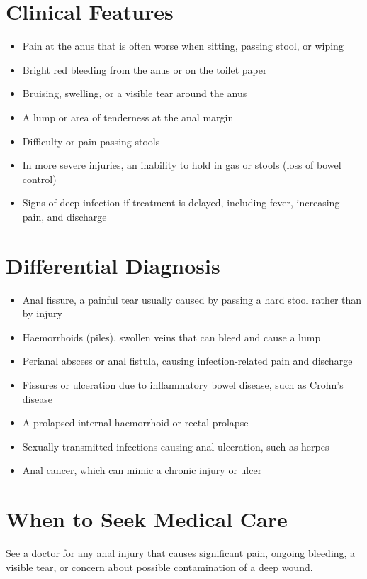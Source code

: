 \section*{Clinical Features}
\begin{itemize}
    \item Pain at the anus that is often worse when sitting, passing stool, or wiping
    \item Bright red bleeding from the anus or on the toilet paper
    \item Bruising, swelling, or a visible tear around the anus
    \item A lump or area of tenderness at the anal margin
    \item Difficulty or pain passing stools
    \item In more severe injuries, an inability to hold in gas or stools (loss of bowel control)
    \item Signs of deep infection if treatment is delayed, including fever, increasing pain, and discharge
\end{itemize}

\section*{Differential Diagnosis}
\begin{itemize}
    \item Anal fissure, a painful tear usually caused by passing a hard stool rather than by injury
    \item Haemorrhoids (piles), swollen veins that can bleed and cause a lump
    \item Perianal abscess or anal fistula, causing infection-related pain and discharge
    \item Fissures or ulceration due to inflammatory bowel disease, such as Crohn's disease
    \item A prolapsed internal haemorrhoid or rectal prolapse
    \item Sexually transmitted infections causing anal ulceration, such as herpes
    \item Anal cancer, which can mimic a chronic injury or ulcer
\end{itemize}

\section*{When to Seek Medical Care}
See a doctor for any anal injury that causes significant pain, ongoing bleeding, a visible tear, or concern about possible contamination of a deep wound.

